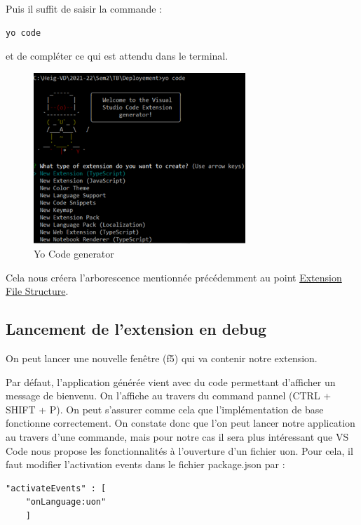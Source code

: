 \documentclass[
    iict, %
    il, %
]{heig-tb}
\begin{document}
Puis il suffit de saisir la commande :

\begin{lstlisting}[frame=single]
yo code
\end{lstlisting}

et de compléter ce qui est attendu dans le terminal.

\begin{figure}[!h]
    \begin{center}
        \includegraphics[width=8cm]{assets/figures/yo-code.png}
    \end{center}
    \caption[Yo Code generator]{\label{yo-code}Yo Code generator}
\end{figure}

Cela nous créera l'arborescence mentionnée précédemment au point \hyperref[Extension File Structure]{Extension File Structure}.

\subsection{Lancement de l'extension en debug}
On peut lancer une nouvelle fenêtre (f5) qui va contenir notre extension.

Par défaut, l'application générée vient avec du code permettant d'afficher un message de bienvenu. On l'affiche au travers du command pannel (CTRL + SHIFT + P). On peut s'assurer comme cela que l'implémentation de base fonctionne correctement.
On constate donc que l'on peut lancer notre application au travers d'une commande, mais pour notre cas il sera plus intéressant que VS Code nous propose les fonctionnalités à l'ouverture d'un fichier uon.
Pour cela, il faut modifier l'activation events dans le fichier package.json par :
\begin{lstlisting}[frame=single]
    "activateEvents" : [
	"onLanguage:uon"
    ]
\end{lstlisting}
\end{document}
